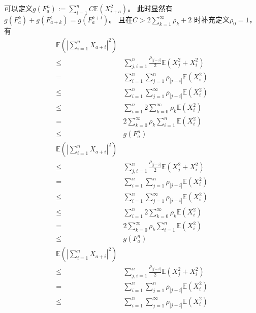 \documentclass{ctexart}
\begin{document}
\begin{remark}\label{re:1}
  可以定义\(g(F_{a}^n):=\sum_{i=1}^{n} C \mathbb{E}(X_{i+a}^2) \)。
  此时显然有\(g(F_{a}^k) + g(F_{a+k}^l) = g(F_a^{k+l}) \)。
  且在\(C>2 \sum_{k=1}^{\infty} \rho_k +2 \) 时补充定义\(\rho_0=1 \)，
  有
  \begin{equation}
    \begin{aligned}
      \mathbb{E}(|\sum_{i=1}^{n}X_{a+i}|^2) \\
      \leq & \sum_{j,i = 1}^{n} \frac{\rho_{|j-i|}}{2}\mathbb{E}(X_j^2 + X_i^2)\\
      =& \sum_{i=1}^{n} \sum_{j=1}^{n}\rho_{|j-i|}\mathbb{E}(X_i^2)\\
      \leq & \sum_{i=1}^{n} \sum_{j=1}^{\infty} \rho_{|j-i|}\mathbb{E}(X_i^2)\\
      \leq & \sum_{i=1}^{n} 2\sum_{k=0}^{\infty} \rho_k \mathbb{E}(X_i^2)\\
      =& 2\sum_{k=0}^{\infty}\rho_k  \sum_{i=1}^{n}\mathbb{E}(X_i^2)\\
      \leq & g(F_a^n)
    \end{aligned}
  \end{equation}
  \begin{equation}
    \begin{aligned}
      \mathbb{E}(|\sum_{i=1}^{n}X_{a+i}|^2) \\
      \leq & \sum_{j,i = 1}^{n} \frac{\rho_{|j-i|}}{2}\mathbb{E}(X_j^2 + X_i^2)\\
      =& \sum_{i=1}^{n} \sum_{j=1}^{n}\rho_{|j-i|}\mathbb{E}(X_i^2)\\
      \leq & \sum_{i=1}^{n} \sum_{j=1}^{\infty} \rho_{|j-i|}\mathbb{E}(X_i^2)\\
      \leq & \sum_{i=1}^{n} 2\sum_{k=0}^{\infty} \rho_k \mathbb{E}(X_i^2)\\
      =& 2\sum_{k=0}^{\infty}\rho_k  \sum_{i=1}^{n}\mathbb{E}(X_i^2)\\
      \leq & g(F_a^n)
    \end{aligned}
  \end{equation}
  \begin{equation}
    \begin{aligned}
      \mathbb{E}(|\sum_{i=1}^{n}X_{a+i}|^2) \\
      \leq & \sum_{j,i = 1}^{n} \frac{\rho_{|j-i|}}{2}\mathbb{E}(X_j^2 + X_i^2)\\
      =& \sum_{i=1}^{n} \sum_{j=1}^{n}\rho_{|j-i|}\mathbb{E}(X_i^2)\\
      \leq & \sum_{i=1}^{n} \sum_{j=1}^{\infty} \rho_{|j-i|}\mathbb{E}(X_i^2)\\

\end{aligned}
\end{equation}
\end{remark}
\end{document}
